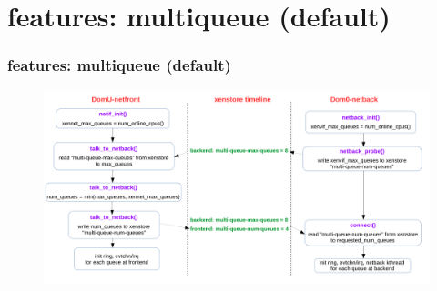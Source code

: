 \documentclass[aspectratio=169]{beamer}
\begin{document}

\section{features: multiqueue (default)}
\begin{frame}
\frametitle{features: multiqueue (default)}
\begin{figure}
\includegraphics[width=1.0\linewidth]{figures/multiqueue.pdf}
\end{figure}
\end{frame}

\end{document}
